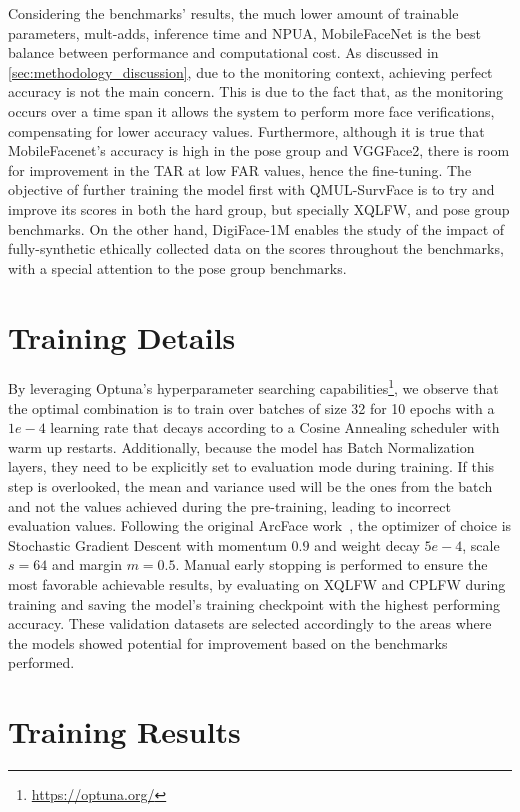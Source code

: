 \documentclass[class=report, crop=false, a4paper, 12pt]{standalone}
\begin{document}
\par Considering the benchmarks' results, the much lower amount of trainable parameters, mult-adds, inference time and NPUA, MobileFaceNet is the best balance between performance and computational cost. As discussed in \autoref{sec:methodology_discussion}, due to the monitoring context, achieving perfect accuracy is not the main concern. This is due to the fact that, as the monitoring occurs over a time span it allows the system to perform more face verifications, compensating for lower accuracy values.
Furthermore, although it is true that MobileFacenet's accuracy is high in the pose group and VGGFace2, there is room for improvement in the TAR at low FAR values, hence the fine-tuning. The objective of further training the model first with QMUL-SurvFace is to try and improve its scores in both the hard group, but specially XQLFW, and pose group benchmarks. On the other hand, DigiFace-1M enables the study of the impact of fully-synthetic ethically collected data on the scores throughout the benchmarks, with a special attention to the pose group benchmarks. 


\section{Training Details}
By leveraging Optuna's hyperparameter searching capabilities\footnote{\url{https://optuna.org/}}, we observe that the optimal combination is to train over batches of size 32 for 10 epochs with a $1e-4$ learning rate that decays according to a Cosine Annealing scheduler with warm up restarts. Additionally, because the model has Batch Normalization layers, they need to be explicitly set to evaluation mode during training. If this step is overlooked, the mean and variance used will be the ones from the batch and not the values achieved during the pre-training, leading to incorrect evaluation values. Following the original ArcFace work~\autocite{dengArcFaceAdditiveAngular}, the optimizer of choice is Stochastic Gradient Descent with momentum $0.9$ and weight decay $5e-4$, scale $s=64$ and margin $m=0.5$. Manual early stopping is performed to ensure the most favorable achievable results, by evaluating on XQLFW and CPLFW during training and saving the model's training checkpoint with the highest performing accuracy. These validation datasets are selected accordingly to the areas where the models showed potential for improvement based on the benchmarks performed.

\section{Training Results}
\end{document}
